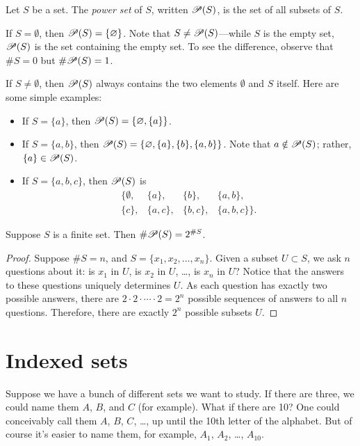 \documentclass{tufte-book}
\begin{document}
\begin{definition}
  Let $S$ be a set. The \emph{power set} of $S$, written $\mathscr{P}(S)$,  is the set of all subsets of $S$.
\end{definition}
If $S = \emptyset$, then $\mathscr{P}(S) = \{\varnothing\}$. Note that $S \neq \mathscr{P}(S)$---while $S$ is the empty set, $\mathscr{P}(S)$ is the set containing the empty set. To see the difference, observe that $\# S = 0$ but $\# \mathscr{P}(S) = 1$.

If $S \neq \emptyset$, then $\mathscr{P}(S)$ always contains the two elements $\emptyset$ and $S$ itself. Here are some simple examples:
\begin{itemize}
    \item If $S = \{a\}$, then $\mathscr{P}(S) = \{\varnothing, \{a\}\}$.
    \item If $S = \{a, b\}$, then $\mathscr{P}(S) = \{\varnothing, \{a\}, \{b\}, \{a, b\}\}$. Note that $a \notin \mathscr{P}(S)$; rather, $\{a\} \in \mathscr{P}(S)$.
    \item If $S = \{a, b, c\}$, then $\mathscr{P}(S)$ is
  \[
  \begin{array}{cccc}
    \{\emptyset, & \{a\}, & \{b\}, & \{a, b\}, \\
    \{c\}, & \{a, c\}, & \{b, c\}, & \{a, b, c\}\}.
  \end{array}
  \]
\end{itemize}

\begin{proposition}
  Suppose $S$ is a finite set. Then $\# \mathscr{P}(S) = 2^{\# S}$.
\end{proposition}

\begin{proof}
  Suppose $\# S = n$, and $S = \{x_1, x_2, \dots, x_n\}$. Given a subset $U \subset S$, we ask $n$ questions about it: is $x_1$ in $U$, is $x_2$ in $U$, \dots, is $x_n$ in $U$? Notice that the answers to these questions uniquely determines $U$. As each question has exactly two possible answers, there are $2 \cdot 2 \cdot \cdots \cdot 2 = 2^n$ possible sequences of answers to all $n$ questions. Therefore, there are exactly $2^n$ possible subsets $U$.
\end{proof}


\section{Indexed sets}
\label{sec:indexed-sets}

Suppose we have a bunch of different sets we want to study. If there are three, we could name them $A$, $B$, and $C$ (for example). What if there are 10? One could conceivably call them $A$, $B$, $C$, \dots, up until the 10th letter of the alphabet. But of course it's easier to name them, for example, $A_1$, $A_2$, \dots, $A_{10}$. 




\end{document}
